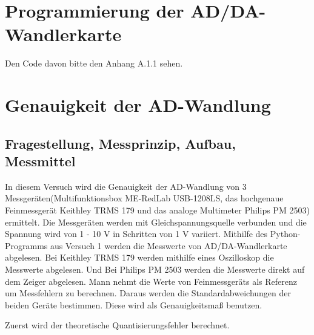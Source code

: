 \documentclass[12pt, oneside, a4paper, \docLanguage]{report}
\begin{document}

\setcounter{section}{0}



\clearpage

%
%


%
%


%
%





\setcounter{page}{1} 
\pagestyle{default}

%
%
\chapter{Programmierung der AD/DA-Wandlerkarte}

Den Code davon bitte den Anhang A.1.1 sehen.




%
%
\chapter{Genauigkeit der AD-Wandlung}
\section{Fragestellung, Messprinzip, Aufbau, Messmittel}
\qquad In diesem Versuch wird die Genauigkeit der AD-Wandlung von 3 Messgeräten(Multifunktionsbox  ME-RedLab USB-1208LS, das hochgenaue Feinmessgerät Keithley TRMS 179 und das analoge Multimeter Philips PM 2503) ermittelt. Die Messgeräten werden mit Gleichspannungsquelle verbunden und die Spannung wird von 1 - 10 V in Schritten von 1 V variiert. Mithilfe des Python-Programms aus Versuch 1 werden die Messwerte von AD/DA-Wandlerkarte abgelesen. Bei Keithley TRMS 179 werden mithilfe eines Oszilloskop die Messwerte abgelesen. Und Bei Philips PM 2503 werden die Messwerte direkt auf dem Zeiger abgelesen. Mann nehmt die Werte von Feinmessgeräts als Referenz um Messfehlern zu berechnen. Daraus werden die Standardabweichungen der beiden Geräte bestimmen. Diese wird als  Genauigkeitsmaß benutzen.


Zuerst wird der theoretische Quantisierungsfehler berechnet. 
\end{document}
